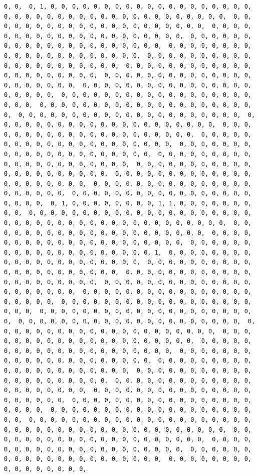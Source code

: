 \documentclass[
]{article}
\begin{document}
\begin{verbatim}
0, 0,  0, 1, 0, 0, 0, 0, 0, 0, 0, 0, 0, 0, 0, 0, 0, 0, 0, 0, 0, 0, 0,  0, 0, 0, 0, 0, 0, 0, 0, 0, 0, 0, 0, 0, 0, 0, 0, 0, 0, 0, 0, 0,  0, 0, 0, 0, 0, 0, 0, 0, 0, 0, 0, 0, 0, 0, 0, 0, 0, 0, 0, 0, 0,  0, 0, 0, 0, 0, 0, 0, 0, 0, 0, 0, 0, 0, 0, 0, 0, 0, 0, 0, 0, 0,  0, 0, 0, 0, 0, 0, 0, 0, 0, 0, 0, 0, 0, 0, 0, 0, 0, 0, 0, 0, 0,  0, 0, 0, 0, 0, 0, 0, 0, 0, 0, 0, 0, 0, 0, 0, 0, 0, 0, 0, 0, 0,  0, 0, 0, 0, 0, 0, 0, 0, 0, 0, 0, 0, 0, 0, 0, 0, 0, 0, 0, 0, 0,  0, 0, 0, 0, 0, 0, 0, 0, 0, 0, 0, 0, 0, 0, 0, 0, 0, 0, 0, 0, 0,  0, 0, 0, 0, 0, 0, 0, 0, 0, 0, 0, 0, 0, 0, 0, 0, 0, 0, 0, 0, 0,  0, 0, 0, 0, 0, 0, 0, 0, 0, 0, 0, 0, 0, 0, 0, 0, 0, 0, 0, 0, 0,  0, 0, 0, 0, 0, 0, 0, 0, 0, 0, 0, 0, 0, 0, 0, 0, 0, 0, 0, 0, 0,  0, 0, 0, 0, 0, 0, 0, 0, 0, 0, 0, 0, 0, 0, 0, 0, 0, 0, 0, 0, 0,  0, 0, 0, 0, 0, 0, 0, 0, 0, 0, 0, 0, 0, 0, 0, 0, 0, 0, 0, 0, 0,  0, 0, 0, 0, 0, 0, 0, 0, 0, 0, 0, 0, 0, 0, 0, 0, 0, 0, 0, 0, 0,  0, 0, 0, 0, 0, 0, 0, 0, 0, 0, 0, 0, 0, 0, 0, 0, 0, 0, 0, 0, 0,  0, 0, 0, 0, 0, 0, 0, 0, 0, 0, 0, 0, 0, 0, 0, 0, 0, 0, 0, 0, 0,  0, 0, 0, 0, 0, 0, 0, 0, 0, 0, 0, 0, 0, 0, 0, 0, 0, 0, 0, 0, 0,  0, 0, 0, 0, 0, 0, 0, 0, 0, 0, 0, 0, 0, 0, 0, 0, 0, 0, 0, 0, 0,  0, 0, 0, 0, 0, 0, 0, 0, 0, 0, 0, 0, 0, 0, 0, 0, 0, 0, 0, 0, 0,  0, 0, 0, 0, 0, 0, 0, 0, 0, 0, 0, 0, 0, 0, 0, 0, 0, 0, 0, 0, 0,  0, 0, 0, 0, 0, 0, 0, 0, 0, 0, 0, 0, 0, 0, 0, 0, 0, 0, 0, 0, 0,  0, 0, 0, 0, 0, 0, 0, 0, 0, 0, 0, 0, 0, 0, 0, 0, 0, 0, 0, 0, 0,  0, 1, 0, 0, 0, 0, 0, 0, 0, 0, 1, 1, 0, 0, 0, 0, 0, 0, 0, 0, 0,  0, 0, 0, 0, 0, 0, 0, 0, 0, 0, 0, 0, 0, 0, 0, 0, 0, 0, 0, 0, 0,  0, 0, 0, 0, 0, 0, 0, 0, 0, 0, 0, 0, 0, 0, 0, 0, 0, 0, 0, 0, 0,  0, 0, 0, 0, 0, 0, 0, 0, 0, 0, 0, 0, 0, 0, 0, 0, 0, 0, 0, 0, 0,  0, 0, 0, 0, 0, 0, 0, 0, 0, 0, 0, 0, 0, 0, 0, 0, 0, 0, 0, 0, 0,  0, 0, 0, 0, 0, 0, 0, 0, 0, 0, 0, 0, 0, 0, 0, 0, 0, 0, 0, 0, 1,  0, 0, 0, 0, 0, 0, 0, 0, 0, 0, 0, 0, 0, 0, 0, 0, 0, 0, 0, 0, 0,  0, 0, 0, 0, 0, 0, 0, 0, 0, 0, 0, 0, 0, 0, 0, 0, 0, 0, 0, 0, 0,  0, 0, 0, 0, 0, 0, 0, 0, 0, 0, 0, 0, 0, 0, 0, 0, 0, 0, 0, 0, 0,  0, 0, 0, 0, 0, 0, 0, 0, 0, 0, 0, 0, 0, 0, 0, 0, 0, 0, 0, 0, 0,  0, 0, 0, 0, 0, 0, 0, 0, 0, 0, 0, 0, 0, 0, 0, 0, 0, 0, 0, 0, 0,  0, 0, 0, 0, 0, 0, 0, 0, 0, 0, 0, 0, 0, 0, 0, 0, 0, 0, 0, 0, 0,  0, 0, 0, 0, 0, 0, 0, 0, 0, 0, 0, 0, 0, 0, 0, 0, 0, 0, 0, 0, 0,  0, 0, 0, 0, 0, 0, 0, 0, 0, 0, 0, 0, 0, 0, 0, 0, 0, 0, 0, 0, 0,  0, 0, 0, 0, 0, 0, 0, 0, 0, 0, 0, 0, 0, 0, 0, 0, 0, 0, 0, 0, 0,  0, 0, 0, 0, 0, 0, 0, 0, 0, 0, 0, 0, 0, 0, 0, 0, 0, 0, 0, 0, 0,  0, 0, 0, 0, 0, 0, 0, 0, 0, 0, 0, 0, 0, 0, 0, 0, 0, 0, 0, 0, 0,  0, 0, 0, 0, 0, 0, 0, 0, 0, 0, 0, 0, 0, 0, 0, 0, 0, 0, 0, 0, 0,  0, 0, 0, 0, 0, 0, 0, 0, 0, 0, 0, 0, 0, 0, 0, 0, 0, 0, 0, 0, 0,  0, 0, 0, 0, 0, 0, 0, 0, 0, 0, 0, 0, 0, 0, 0, 0, 0, 0, 0, 0, 0,  0, 0, 0, 0, 0, 0, 0, 0, 0, 0, 0, 0, 0, 0, 0, 0, 0, 0, 0, 0, 0,  0, 0, 0, 0, 0, 0, 0, 0, 0, 0, 0, 0, 0, 0, 0, 0, 0, 0, 0, 0, 0,  0, 0, 0, 0, 0, 0, 0, 0, 0, 0, 0, 0, 0, 0, 0, 0, 0, 0, 0, 0, 0,  0, 0, 0, 0, 0, 0, 0, 0, 0, 0, 0, 0, 0, 0, 0, 0, 0, 0, 0, 0, 0,  0, 0, 0, 0, 0, 0, 0, 0, 0, 0, 0, 0, 0, 0, 0, 0, 0, 0, 0, 0, 0,  0, 0, 0, 0, 0, 0, 0, 0, 0, 0, 0, 0, 0, 0, 0, 0, 0, 0, 0, 0, 0,  0, 0, 0, 0, 0, 0, 0, 0, 0, 0, 0, 0, 0, 0, 0, 0, 0, 0, 0, 0, 0,  0, 0, 0, 0, 0, 0, 0, 0, 0, 0, 0, 0, 0, 0, 0, 0, 0, 0, 0, 0, 0,  0, 0, 0, 0, 0, 0, 0, 0, 0, 0, 0, 0, 0, 0, 0, 0, 0, 0, 0, 0, 0,  0, 0, 0, 0, 0, 0, 0, 0, 0, 0, 0, 0, 0, 0, 0, 0, 
\end{verbatim}
\end{document}
